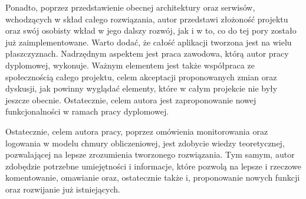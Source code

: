Ponadto, poprzez przedstawienie obecnej architektury oraz serwisów, wchodzących w skład całego rozwiązania, autor przedstawi złożoność projektu
oraz swój osobisty wkład w jego dalszy rozwój, jak i w to, co do tej pory zostało już zaimplementowane. Warto dodać, że całość
aplikacji tworzona jest na wielu płaszczyznach. Nadrzędnym aspektem jest praca zawodowa, którą autor pracy dyplomowej, wykonuje.
Ważnym elementem jest także współpraca ze społecznością całego projektu, celem akceptacji proponowanych zmian
oraz dyskusji, jak powinny wyglądać elementy, które w całym projekcie nie były jeszcze obecnie. Ostatecznie, celem autora 
jest zaproponowanie nowej funkcjonalności w ramach pracy dyplomowej.

Ostatecznie, celem autora pracy, poprzez omówienia monitorowania oraz logowania w modelu chmury obliczeniowej, jest zdobycie wiedzy
teoretycznej, pozwalającej na lepsze zrozumienia tworzonego rozwiązania. Tym samym, autor zdobędzie potrzebne umiejętności i informacje, 
które pozwolą na lepsze i rzeczowe komentowanie, omawianie oraz, ostatecznie także i, proponowanie nowych funkcji oraz rozwijanie
już istniejących.  
